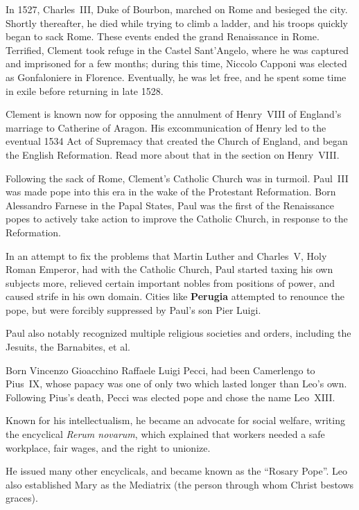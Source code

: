In 1527, Charles~III, Duke of Bourbon, marched on Rome and besieged the city.
Shortly thereafter, he died while trying to climb a ladder,
and his troops quickly began to sack Rome.
These events ended the grand Renaissance in Rome.
Terrified, Clement took refuge in the Castel Sant'Angelo,
where he was captured and imprisoned for a few months;
during this time, Niccolo Capponi was elected as Gonfaloniere in Florence.
Eventually, he was let free, and he spent some time in exile before returning in late 1528.

Clement is known now for opposing the annulment of Henry~VIII of England's marriage
to Catherine of Aragon.
His excommunication of Henry led to the eventual 1534 Act of Supremacy
that created the Church of England,
and began the English Reformation.
Read more about that in the section on Henry~VIII.

\filbreak
{}

Following the sack of Rome, Clement's Catholic Church was in turmoil.
Paul~III was made pope into this era in the wake of the Protestant Reformation.
Born Alessandro Farnese in the Papal States,
Paul was the first of the Renaissance popes to actively take action to improve the Catholic Church,
in response to the Reformation.

In an attempt to fix the problems that Martin Luther and Charles~V, Holy Roman Emperor,
had with the Catholic Church, Paul started taxing his own subjects more,
relieved certain important nobles from positions of power, and caused strife in his own domain.
Cities like \textbf{Perugia} attempted to renounce the pope,
but were forcibly suppressed by Paul's son Pier Luigi.

Paul also notably recognized multiple religious societies and orders,
including the Jesuits, the Barnabites, et al.


Born Vincenzo Gioacchino Raffaele Luigi Pecci,
had been Camerlengo to Pius~IX,
whose papacy was one of only two which lasted longer than Leo's own.
Following Pius's death, Pecci was elected pope and chose the name Leo~XIII.

Known for his intellectualism, he became an advocate for social welfare,
writing the encyclical \textit{Rerum novarum},
which explained that workers needed a safe workplace, fair wages, and the right to unionize.

He issued many other encyclicals, and became known as the ``Rosary Pope''.
Leo also established Mary as the Mediatrix (the person through whom Christ bestows graces).

